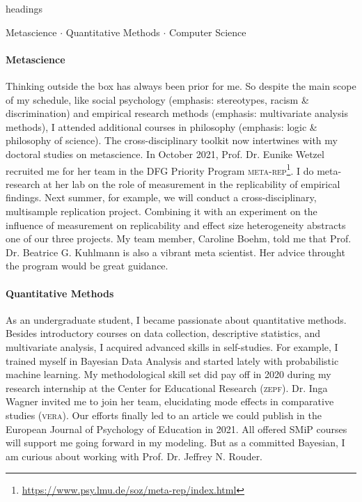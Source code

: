 \documentclass[11pt]{FreemanML}
\begin{document}
\begin{color}{headings}
	\begin{center}
		Metascience $\cdot$ Quantitative Methods $\cdot$ Computer Science
	\end{center}
\end{color}
\vspace{-0.2cm}

\paragraph{Metascience}

Thinking outside the box has always been prior for me. So despite the main
scope of my schedule, like social psychology (emphasis: stereotypes, racism \&
discrimination) and empirical research methods (emphasis: multivariate analysis
methods), I attended additional courses in philosophy (emphasis: logic \&
philosophy of science). The cross-disciplinary toolkit now intertwines with my
doctoral studies on metascience. In October 2021, Prof. Dr. Eunike Wetzel
recruited me for her team in the DFG Priority Program
\textsc{meta-rep}\footnote{\url{https://www.psy.lmu.de/soz/meta-rep/index.html}}. I do
meta-research at her lab on the role of measurement in the replicability of
empirical findings. Next summer, for example, we will conduct a
cross-disciplinary, multisample replication project. Combining it with an
experiment on the influence of measurement on replicability and effect size
heterogeneity abstracts one of our three projects. My team member, Caroline
Boehm, told me that Prof. Dr. Beatrice G. Kuhlmann is also a vibrant meta
scientist. Her advice throught the program would be great guidance. 

\paragraph{Quantitative Methods}

As an undergraduate student, I became passionate about quantitative methods.
Besides introductory courses on data collection, descriptive statistics, and
multivariate analysis, I acquired advanced skills in self-studies. For example,
I trained myself in Bayesian Data Analysis and started lately with
probabilistic machine learning. My methodological skill set did pay off in 2020
during my research internship at the Center for Educational Research
(\textsc{zepf}). Dr. Inga Wagner invited me to join her team, elucidating mode
effects in comparative studies (\textsc{vera}). Our efforts finally led to an
article we could publish in the European Journal of Psychology of Education in
2021. All offered SMiP courses will support me going forward in my modeling.
But as a committed Bayesian, I am curious about working with Prof. Dr. Jeffrey
N. Rouder.
\end{document}
